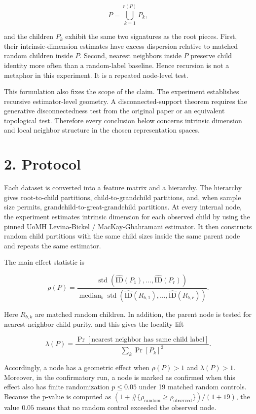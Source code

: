 \documentclass[11pt]{article}
\begin{document}
\[
P = \bigcup_{k=1}^{r(P)} P_k,
\]

and the children \(P_k\) exhibit the same two signatures as the root pieces. First, their intrinsic-dimension estimates have excess dispersion relative to matched random children inside \(P\). Second, nearest neighbors inside \(P\) preserve child identity more often than a random-label baseline. Hence recursion is not a metaphor in this experiment. It is a repeated node-level test.

This formulation also fixes the scope of the claim. The experiment establishes recursive estimator-level geometry. A disconnected-support theorem requires the generative disconnectedness test from the original paper or an equivalent topological test. Therefore every conclusion below concerns intrinsic dimension and local neighbor structure in the chosen representation spaces.

\section{2. Protocol}\label{protocol}

Each dataset is converted into a feature matrix and a hierarchy. The hierarchy gives root-to-child partitions, child-to-grandchild partitions, and, when sample size permits, grandchild-to-great-grandchild partitions. At every internal node, the experiment estimates intrinsic dimension for each observed child by using the pinned UoMH Levina-Bickel / MacKay-Ghahramani estimator. It then constructs random child partitions with the same child sizes inside the same parent node and repeats the same estimator.

The main effect statistic is

\[
\rho(P) =
\frac{\operatorname{std}(\widehat{\mathrm{ID}}(P_1),\ldots,\widehat{\mathrm{ID}}(P_r))}
{\operatorname{median}_{b}\operatorname{std}(\widehat{\mathrm{ID}}(R_{b,1}),\ldots,\widehat{\mathrm{ID}}(R_{b,r}))}.
\]

Here \(R_{b,k}\) are matched random children. In addition, the parent node is tested for nearest-neighbor child purity, and this gives the locality lift

\[
\lambda(P) =
\frac{\Pr[\text{nearest neighbor has same child label}]}
{\sum_k \Pr[P_k]^2}.
\]

Accordingly, a node has a geometric effect when \(\rho(P) > 1\) and \(\lambda(P) > 1\). Moreover, in the confirmatory run, a node is marked as confirmed when this effect also has finite randomization \(p \leq 0.05\) under 19 matched random controls. Because the p-value is computed as \((1 + \#\{\rho_{\mathrm{random}} \geq \rho_{\mathrm{observed}}\})/(1 + 19)\), the value \(0.05\) means that no random control exceeded the observed node.
\end{document}

